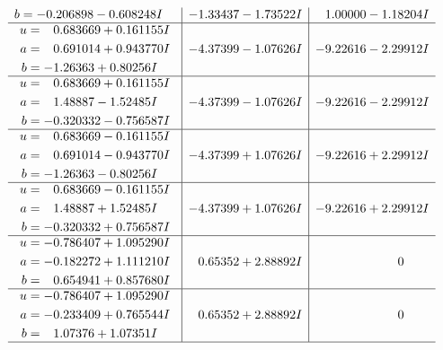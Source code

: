 \documentclass[1p]{elsarticle_modified}
\theoremstyle{definition}
\begin{document}
$$\begin{array}{c|c|c}
\begin{aligned}
b &= -0.206898 - 0.608248 I\end{aligned}
 & -1.33437 - 1.73522 I & \phantom{-}1.00000 - 1.18204 I \\ \hline\begin{aligned}
u &= \phantom{-}0.683669 + 0.161155 I \\
a &= \phantom{-}0.691014 + 0.943770 I \\
b &= -1.26363 + 0.80256 I\end{aligned}
 & -4.37399 - 1.07626 I & -9.22616 - 2.29912 I \\ \hline\begin{aligned}
u &= \phantom{-}0.683669 + 0.161155 I \\
a &= \phantom{-}1.48887 - 1.52485 I \\
b &= -0.320332 - 0.756587 I\end{aligned}
 & -4.37399 - 1.07626 I & -9.22616 - 2.29912 I \\ \hline\begin{aligned}
u &= \phantom{-}0.683669 - 0.161155 I \\
a &= \phantom{-}0.691014 - 0.943770 I \\
b &= -1.26363 - 0.80256 I\end{aligned}
 & -4.37399 + 1.07626 I & -9.22616 + 2.29912 I \\ \hline\begin{aligned}
u &= \phantom{-}0.683669 - 0.161155 I \\
a &= \phantom{-}1.48887 + 1.52485 I \\
b &= -0.320332 + 0.756587 I\end{aligned}
 & -4.37399 + 1.07626 I & -9.22616 + 2.29912 I \\ \hline\begin{aligned}
u &= -0.786407 + 1.095290 I \\
a &= -0.182272 + 1.111210 I \\
b &= \phantom{-}0.654941 + 0.857680 I\end{aligned}
 & \phantom{-}0.65352 + 2.88892 I & \phantom{-0.000000 } 0 \\ \hline\begin{aligned}
u &= -0.786407 + 1.095290 I \\
a &= -0.233409 + 0.765544 I \\
b &= \phantom{-}1.07376 + 1.07351 I\end{aligned}
 & \phantom{-}0.65352 + 2.88892 I & \phantom{-0.000000 } 0\\
 \hline 
 \end{array}$$\newpage$$\begin{array}{c|c|c}  

\end{array}$$
\end{document}

